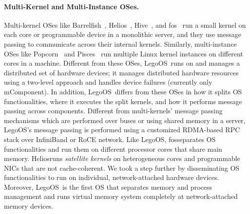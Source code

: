 \documentclass[10pt,times,twocolumn]{z2-article}
\renewcommand{\em}{\it}
\newcommand{\splitkernel}{splitkernel}
\newcommand{\lego}{LegoOS}
\newcommand{\mcomponent}{mComponent}
\providecommand{\DIFaddtex}[1]{{\protect\color{blue}\uwave{#1}}} %
\providecommand{\DIFaddbegin}{} %
\providecommand{\DIFaddend}{} %
\providecommand{\DIFdelbegin}{} %
\providecommand{\DIFdelend}{} %
\providecommand{\DIFadd}[1]{\texorpdfstring{\DIFaddtex{#1}}{#1}} %
\newcommand{\DIFscaledelfig}{0.5}
\newlength{\DIFdelgraphicswidth} %
\newlength{\DIFdelgraphicsheight} %
\newcommand{\DIFaddincludegraphics}[2][]{{\color{blue}\fbox{\DIFOincludegraphics[#1]{#2}}}} %
\newcommand{\DIFdelincludegraphics}[2][]{%
\sbox{\DIFdelgraphicsbox}{\DIFOincludegraphics[#1]{#2}}%
\settoboxwidth{\DIFdelgraphicswidth}{\DIFdelgraphicsbox} %
\settoboxtotalheight{\DIFdelgraphicsheight}{\DIFdelgraphicsbox} %
\scalebox{\DIFscaledelfig}{%
\parbox[b]{\DIFdelgraphicswidth}{\usebox{\DIFdelgraphicsbox}\\[-\baselineskip] \rule{\DIFdelgraphicswidth}{0em}}\llap{\resizebox{\DIFdelgraphicswidth}{\DIFdelgraphicsheight}{%
\setlength{\unitlength}{\DIFdelgraphicswidth}%
\begin{picture}(1,1)%
\thicklines\linethickness{2pt} %
{\color[rgb]{1,0,0}\put(0,0){\framebox(1,1){}}}%
{\color[rgb]{1,0,0}\put(0,0){\line( 1,1){1}}}%
{\color[rgb]{1,0,0}\put(0,1){\line(1,-1){1}}}%
\end{picture}%
}\hspace*{3pt}}} %
} %
\DeclareRobustCommand{\DIFaddbegin}{\DIFOaddbegin \let\includegraphics\DIFaddincludegraphics} %
\DeclareRobustCommand{\DIFaddend}{\DIFOaddend \let\includegraphics\DIFOincludegraphics} %
\DeclareRobustCommand{\DIFdelbegin}{\DIFOdelbegin \let\includegraphics\DIFdelincludegraphics} %
\DeclareRobustCommand{\DIFdelend}{\DIFOaddend \let\includegraphics\DIFOincludegraphics} %
\begin{document}
{{{{{{{%
\DIFdelend \paragraph{Multi-Kernel and Multi-Instance OSes.}
Multi-kernel OSes like Barrelfish~\cite{Baumann-SOSP09,Barrelfish-DC}, Helios~\cite{Helios-SOSP}, Hive~\cite{Hive-SOSP}, and fos~\cite{fos-SOCC}
run a small kernel on each core or programmable device in a monolithic server,
and they use message passing to communicate across their internal kernels.
Similarly, multi-instance OSes like Popcorn~\cite{popcorn-eurosys15} and Pisces~\cite{Pisces-hpdc15} run multiple Linux kernel instances
on different cores in a machine. %
Different from these OSes, \lego\ runs on and manages a distributed set of hardware devices;
it manages distributed hardware resources using a two-level approach and handles device failures (currently only \mcomponent).
In addition, \lego\ differs from these OSes in how it splits OS functionalities, where it executes the split kernels,
and how it performs message passing across components.
Different from multi-kernels' message passing mechanisms which are performed over buses or using shared memory in a server, 
\lego's message passing is performed using a customized RDMA-based RPC stack over InfiniBand or RoCE network.
Like \lego, fos\DIFaddbegin \DIFadd{~\mbox{%
\cite{fos-SOCC} }%
}\DIFaddend separates OS functionalities and run them on different processor cores that share main memory.
Helios\DIFaddbegin \DIFadd{~\mbox{%
\cite{Helios-SOSP} }%
}\DIFaddend runs {\em satellite kernels} on heterogeneous cores and programmable NICs that are not cache-coherent.
We took a step further by disseminating OS functionalities to run on individual, network-attached hardware devices. %
Moreover, \lego\ is the first OS that separates memory and process management and runs virtual memory system completely at network-attached memory devices.

\DIFdelbegin %

}}}}}}}
\end{document}
